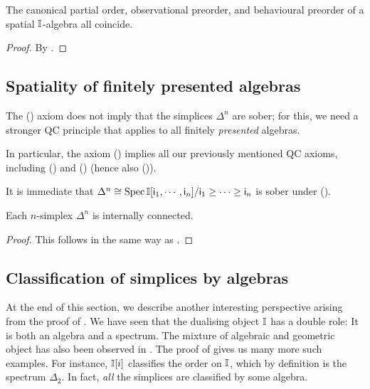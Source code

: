 \begin{corollary}[\AxiomSQCP]
  The canonical partial order, observational preorder, and behavioural preorder of a spatial $\mathbb{I}$-algebra all coincide.
\end{corollary}

\begin{proof}
  By .
\end{proof}


\subsection{Spatiality of finitely presented algebras}

The (\AxiomSQCP) axiom does not imply that the simplices $\Delta^n$ are sober; for this, we need a stronger \gls{QC} principle that applies to all finitely \emph{presented} algebras.


\PrintAxiomSQCF

\begin{remark}
  In particular, the axiom (\AxiomSQCF) implies all our previously mentioned \gls{QC} axioms, including (\AxiomSQCP) and (\AxiomSQCID) (hence also (\AxiomSQCI)).
\end{remark}

It is immediate that $\Delta^n\cong \operatorname{Spec}\mathbb{I}[\mathsf{i}_1,\cdots,\mathsf{i}_n]/\mathsf{i}_1\geq \cdots \geq \mathsf{i}_n$ is sober under (\AxiomSQCF).

\begin{corollary}[\AxiomSQCF]
  Each $n$-simplex $\Delta^n$ is internally connected.
\end{corollary}

\begin{proof}
  This follows in the same way as .
\end{proof}

\subsection{Classification of simplices by algebras}

At the end of this section, we describe another interesting perspective arising from the proof of . We have seen that the dualising object $\mathbb{I}$ has a double role: It is both an algebra and a spectrum. The mixture of algebraic and geometric object has also been observed in . The proof of  gives us many more such examples. For instance, $\mathbb{I}[i]$ classifies the order on $\mathbb{I}$, which by definition is the spectrum $\Delta_2$. In fact, \emph{all} the simplices are classified by some algebra.

